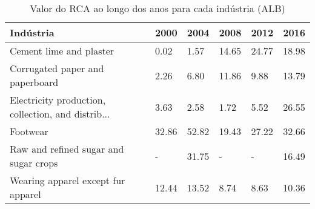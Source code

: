 \begin{table}
\centering
\caption{Valor do RCA ao longo dos anos para cada indústria (ALB)}
\begin{tabular}{p{6cm}p{1.5cm}p{1.5cm}p{1.5cm}p{1.5cm}p{1.5cm}}
\toprule
                                         Indústria &  2000 &  2004 &  2008 &  2012 &  2016 \\
\midrule
                           Cement lime and plaster &  0.02 &  1.57 & 14.65 & 24.77 & 18.98 \\
                   Corrugated paper and paperboard &  2.26 &  6.80 & 11.86 &  9.88 & 13.79 \\
Electricity production, collection, and distrib... &  3.63 &  2.58 &  1.72 &  5.52 & 26.55 \\
                                          Footwear & 32.86 & 52.82 & 19.43 & 27.22 & 32.66 \\
             Raw and refined sugar and sugar crops &     - & 31.75 &     - &     - & 16.49 \\
                Wearing apparel except fur apparel & 12.44 & 13.52 &  8.74 &  8.63 & 10.36 \\
\bottomrule
\end{tabular}
\end{table}
